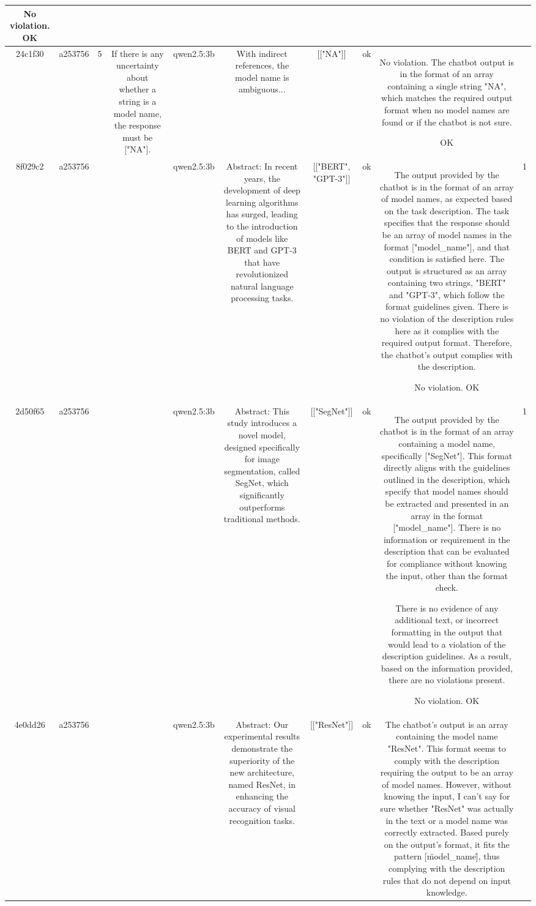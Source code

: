 \begin{table}[h!]
\begin{tabular}{|c|c|c|c|c|c|c|c|c|c|}
No violation.
OK & \\
\hline
24c1f30 & a253756 & 5 & If there is any uncertainty about whether a string is a model name, the response must be ["NA"]. & qwen2.5:3b & With indirect references, the model name is ambiguous... & [["NA"]] & ok & No violation. The chatbot output is in the format of an array containing a single string "NA", which matches the required output format when no model names are found or if the chatbot is not sure. 

OK & \\
\hline
8f029c2 & a253756 &  &  & qwen2.5:3b & Abstract: In recent years, the development of deep learning algorithms has surged, leading to the introduction of models like BERT and GPT-3 that have revolutionized natural language processing tasks. & [["BERT", "GPT-3"]] & ok & The output provided by the chatbot is in the format of an array of model names, as expected based on the task description. The task specifies that the response should be an array of model names in the format ["model_name"], and that condition is satisfied here. The output is structured as an array containing two strings, "BERT" and "GPT-3", which follow the format guidelines given. There is no violation of the description rules here as it complies with the required output format. Therefore, the chatbot's output complies with the description.

No violation.
OK & 1\\
\hline
2d50f65 & a253756 &  &  & qwen2.5:3b & Abstract: This study introduces a novel model, designed specifically for image segmentation, called SegNet, which significantly outperforms traditional methods. & [["SegNet"]] & ok & The output provided by the chatbot is in the format of an array containing a model name, specifically ["SegNet"]. This format directly aligns with the guidelines outlined in the description, which specify that model names should be extracted and presented in an array in the format ["model_name"]. There is no information or requirement in the description that can be evaluated for compliance without knowing the input, other than the format check.

There is no evidence of any additional text, or incorrect formatting in the output that would lead to a violation of the description guidelines. As a result, based on the information provided, there are no violations present.

No violation.
OK & 1\\
\hline
4e0dd26 & a253756 &  &  & qwen2.5:3b & Abstract: Our experimental results demonstrate the superiority of the new architecture, named ResNet, in enhancing the accuracy of visual recognition tasks. & [["ResNet"]] & ok & The chatbot's output is an array containing the model name "ResNet". This format seems to comply with the description requiring the output to be an array of model names. However, without knowing the input, I can't say for sure whether "ResNet" was actually in the text or a model name was correctly extracted. Based purely on the output's format, it fits the pattern [\"model_name\"], thus complying with the description rules that do not depend on input knowledge.


\end{tabular}
\end{table}
